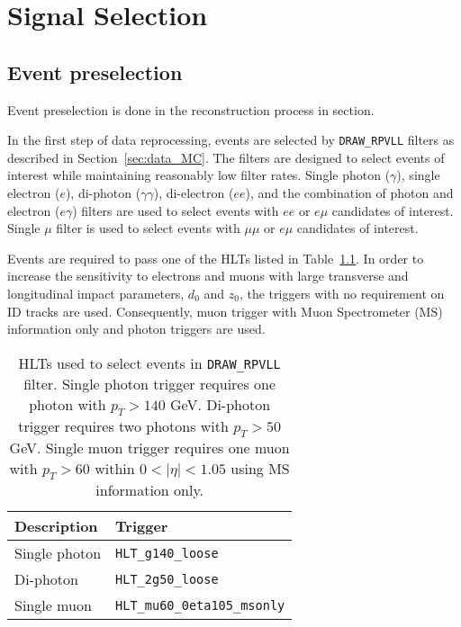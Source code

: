 \chapter{Signal Selection}
\label{chap:signal_selection}

\section{Event preselection}
\label{sec:selection:pre}


Event preselection is done in the reconstruction process in section.

In the first step of data reprocessing, events are selected by \texttt{DRAW\_RPVLL} filters as described in Section~\ref{sec:data_MC}. The filters are designed to select events of interest while maintaining reasonably low filter rates. Single photon ($\gamma$), single electron ($e$), di-photon ($\gamma\gamma$), di-electron ($ee$), and the combination of photon and electron ($e\gamma$) filters are used to select events with $ee$ or $e\mu$ candidates of interest. Single $\mu$ filter is used to select events with $\mu\mu$ or $e\mu$ candidates of interest.

Events are required to pass one of the HLTs listed in Table~\ref{table:triggers}. In order to increase the sensitivity to electrons and muons with large transverse and longitudinal impact parameters, $d_{0}$ and $z_{0}$, the triggers with no requirement on ID tracks are used. Consequently, muon trigger with Muon Spectrometer (MS) information only and photon triggers are used.

\begin{table}[!htb]
  \centering
  \begin{tabular}{l l}
    \hline
    \hline
    Description     			& Trigger	        	                \\
    \hline
	Single photon 	            & \texttt{HLT\_g140\_loose}             \\
	Di-photon	                & \texttt{HLT\_2g50\_loose}             \\
	Single muon                 & \texttt{HLT\_mu60\_0eta105\_msonly}   \\
    \hline
    \hline
  \end{tabular}
  \caption{HLTs used to select events in \texttt{DRAW\_RPVLL} filter. Single photon trigger requires one photon with $p_{T} > 140$ GeV. Di-photon trigger requires two photons with $p_{T} > 50$ GeV. Single muon trigger requires one muon with $p_{T} > 60$ within $0 < |\eta| < 1.05$ using MS information only.}
  \label{table:triggers}
\end{table}

